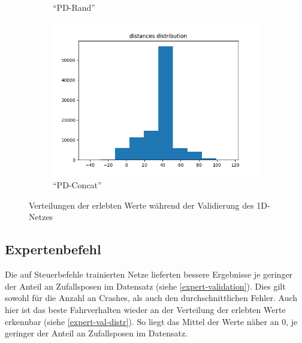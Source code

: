 \begin{figure}[H]
\begin{subfigure}[h]{0.3\textwidth}
		\caption{``PD-Rand''}
		\label{1d-pd-rand-val-distr}
	\end{subfigure}
	\begin{subfigure}[h]{0.3\textwidth}
		\centering
		\includegraphics[width=\linewidth]{kapitel5/images/eval/d-only/pd-concat-distr.png}
		\caption{``PD-Concat''}
		\label{1d-pd-concat-val-distr}
	\end{subfigure}
	\caption{Verteilungen der erlebten Werte während der Validierung des 1D-Netzes}
	\label{1d-val-distr}
\end{figure}

\subsection{Expertenbefehl}

Die auf Steuerbefehle trainierten Netze lieferten bessere Ergebnisse je geringer der Anteil an Zufallsposen im Datensatz (siehe \ref{expert-validation}). Dies gilt sowohl für die Anzahl an Crashes, als auch den durchschnittlichen Fehler.
Auch hier ist das beste Fahrverhalten wieder an der Verteilung der erlebten Werte erkennbar (siehe \ref{expert-val-distr}). So liegt das Mittel der Werte näher an 0, je geringer der Anteil an Zufallsposen im Datensatz.

